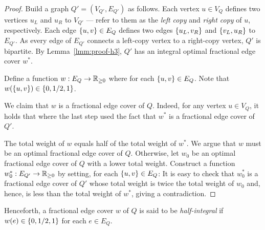 \begin{proof}
   Build a graph $Q' = (V_{Q'}, E_{Q'})$ as follows. Each vertex $u \in V_Q$ defines two vertices $u_L$ and $u_R$ to $V_{Q'}$ --- refer to them as the {\em left copy} and {\em right copy} of $u$, respectively. Each edge $\{u, v\} \in E_Q$ defines two edges $\{u_L, v_R\}$ and $\{v_L, u_R\}$ to $E_{Q'}$. As every edge of $E_{Q'}$ connects a left-copy vertex to a right-copy vertex, $Q'$ is bipartite. By Lemma~\ref{lmm:proof-h3}, $Q'$ has an integral optimal fractional edge cover $w^*$.

   \vgap

   Define a function $w: E_Q \rightarrow \mathbb{R}_{\ge 0}$ where
   for each $\{u, v\} \in E_Q$.
   Note that $w(\{u, v\}) \in \{0, 1/2, 1\}$.

   \vgap

   We claim that $w$ is a fractional edge cover of $Q$. Indeed, for any vertex $u \in V_Q$, it holds that
   where the last step used the fact that $w^*$ is a fractional edge cover of $Q'$.

   \vgap

   The total weight of $w$ equals half of the total weight of $w^*$. We argue that $w$ must be an optimal fractional edge cover of $Q$. Otherwise, let $w_0$ be an optimal fractional edge cover of $Q$ with a lower total weight. Construct a function $w^*_0: E_{Q'} \rightarrow \mathbb{R}_{\ge 0}$ by setting, for each $\{u, v\} \in E_Q$:
   It is easy to check that $w^*_0$ is a fractional edge cover of $Q'$ whose total weight is twice the total weight of $w_0$ and, hence, is less than the total weight of $w^*$, giving a contradiction.
\end{proof}


Henceforth, a fractional edge cover $w$ of $Q$ is said to be {\em half-integral} if $w(e) \in \{0, 1/2, 1\}$ for each $e \in E_Q$.

